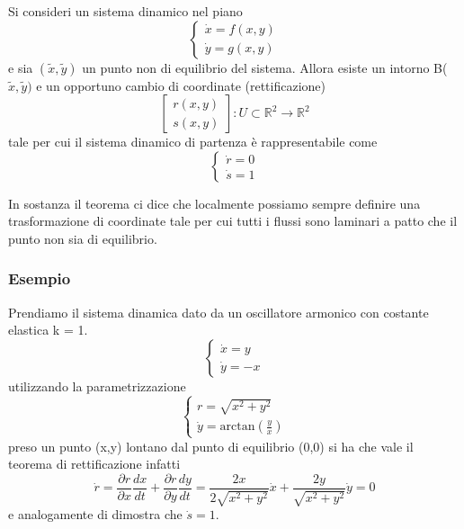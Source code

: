 \begin{theorem}
	Si consideri un sistema dinamico nel piano 
	\begin{equation*}
		\left \{ \begin{array}{l}
			\dot{x} = f(x,y) \\
			\dot{y} = g(x,y)
		\end{array} \right.
	\end{equation*}
e sia $(\tilde{x},\tilde{y})$ un punto non di equilibrio del sistema. Allora esiste un intorno B($\tilde{x},\tilde{y})$ e un opportuno cambio di coordinate (rettificazione)
\begin{equation*}
	\left [\begin{array}{c}
		r(x,y)\\
		s(x,y)
	\end{array} \right]
	: U \subset \mathbb{R}^2 \rightarrow \mathbb{R}^2
\end{equation*}
tale per cui il sistema dinamico di partenza \`{e} rappresentabile come 
\begin{equation*}
		\left \{ \begin{array}{l}
			\dot{r} = 0 \\
			\dot{s} = 1
		\end{array} \right.
	\end{equation*}
\end{theorem}
In sostanza il teorema ci dice che localmente possiamo sempre definire una trasformazione di coordinate tale per cui tutti i flussi sono laminari a patto che il punto non sia di equilibrio.

\subsubsection{Esempio}

Prendiamo il sistema dinamica dato da un oscillatore armonico con costante elastica k = 1.
\begin{equation*}
		\left \{ \begin{array}{l}
			\dot{x} = y \\
			\dot{y} = -x
		\end{array} \right.
\end{equation*}
utilizzando la parametrizzazione 
\begin{equation*}
		\left \{ \begin{array}{l}
			r = \sqrt{x^2+y^2} \\
			\dot{y} = \text{arctan}(\frac{y}{x})
		\end{array} \right.
\end{equation*}
preso un punto (x,y) lontano dal punto di equilibrio (0,0) si ha che vale il teorema di rettificazione
infatti
\begin{equation*}
	\dot{r} = \frac{\partial r}{\partial x}\frac{dx}{dt} + \frac{\partial r}{\partial y}\frac{dy}{dt} =\frac{2x}{2\sqrt{x^2+y^2}}\dot{x} + \frac{2y}{\sqrt{x^2+y^2}}\dot{y} = 0
\end{equation*}
e analogamente di dimostra che $\dot{s} = 1$.
